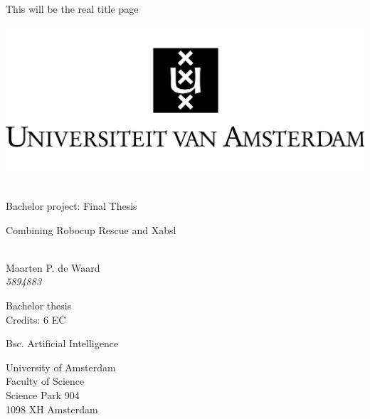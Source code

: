 \thispagestyle{empty}
This will be the real title page
\newpage
\begin{center}
\thispagestyle{empty}


\vspace{2.5cm}

\includegraphics[width=.7\textwidth]{uva.jpg}\\
\vspace{0.5cm}
\hrulefill\\
\begin{Huge}
Bachelor project: Final Thesis\\
\end{Huge}
\vspace{0.2cm}
\begin{Large} 
Combining Robocup Rescue and Xabsl\\
\end{Large}
\hrulefill\\

{
\Large
Maarten P. de Waard\\\vspace{0.2cm}
\textit{5894883}
}

\vspace{1.5cm}

Bachelor thesis\\
Credits: 6 EC

\vspace{0.5cm}

Bsc. Artificial Intelligence

\vspace{0.25cm}

University of Amsterdam\\
Faculty of Science\\
Science Park 904\\
1098 XH Amsterdam


\end{center}
